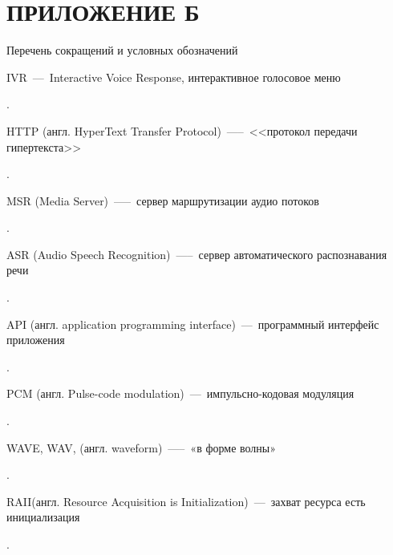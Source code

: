 \chapter{ПРИЛОЖЕНИЕ Б}
\begin{center}
    Перечень сокращений и условных обозначений
\end{center}

\hypertarget{ivr}{IVR~---~Interactive Voice Response, интерактивное голосовое меню}.

\hypertarget{http}{HTTP (англ. HyperText Transfer Protocol)~—--~<<протокол передачи \\ \mbox{гипертекста}>>}.

\hypertarget{msr}{MSR (Media Server)~—--~сервер маршрутизации аудио потоков}.

\hypertarget{asr}{ASR (Audio Speech Recognition)~—--~сервер автоматического распознавания речи}.

\hypertarget{api}{API (англ. application programming interface)~---~программный интерфейс приложения}.

\hypertarget{pcm}{PCM (англ. Pulse-code modulation)~---~импульсно-кодовая модуляция}.

\hypertarget{wav}{WAVE, WAV, (англ. waveform)~—--~«в форме волны»}.

\hypertarget{raii}{RAII(англ. Resource Acquisition is Initialization)~---~захват ресурса есть инициализация}.

\clearpage
